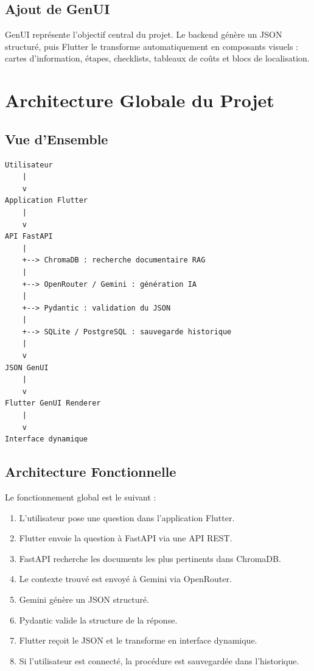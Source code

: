 \documentclass[12pt,a4paper]{report}
\begin{document}
\section{Ajout de GenUI}

GenUI représente l'objectif central du projet. Le backend génère un JSON structuré, puis Flutter le transforme automatiquement en composants visuels : cartes d'information, étapes, checklists, tableaux de coûts et blocs de localisation.


\chapter{Architecture Globale du Projet}

\section{Vue d'Ensemble}

\begin{verbatim}
Utilisateur
    |
    v
Application Flutter
    |
    v
API FastAPI
    |
    +--> ChromaDB : recherche documentaire RAG
    |
    +--> OpenRouter / Gemini : génération IA
    |
    +--> Pydantic : validation du JSON
    |
    +--> SQLite / PostgreSQL : sauvegarde historique
    |
    v
JSON GenUI
    |
    v
Flutter GenUI Renderer
    |
    v
Interface dynamique
\end{verbatim}

\section{Architecture Fonctionnelle}

Le fonctionnement global est le suivant :

\begin{enumerate}
    \item L'utilisateur pose une question dans l'application Flutter.
    \item Flutter envoie la question à FastAPI via une API REST.
    \item FastAPI recherche les documents les plus pertinents dans ChromaDB.
    \item Le contexte trouvé est envoyé à Gemini via OpenRouter.
    \item Gemini génère un JSON structuré.
    \item Pydantic valide la structure de la réponse.
    \item Flutter reçoit le JSON et le transforme en interface dynamique.
    \item Si l'utilisateur est connecté, la procédure est sauvegardée dans l'historique.
\end{enumerate}
\end{document}
